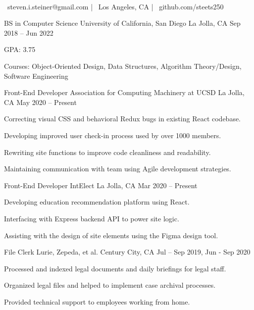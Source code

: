 \documentclass[]{awesome-cv}
\begin{document}
    
\begin{center}
	 \\
	\vspace{2mm}
	{\faEnvelope\ steven.i.steiner@gmail.com} | {\faMapMarker\ Los Angeles, CA} | {\faGithub\ github.com/steets250}
\end{center}

\begin{cventries}
	\cventry
	{BS in Computer Science}
	{University of California, San Diego}
	{La Jolla, CA}
	{Sep 2018 – Jun 2022}
	{\begin{cvitems}
		\item {GPA: 3.75}
		\item {Courses: Object-Oriented Design, Data Structures, Algorithm Theory/Design, Software Engineering}
		\end{cvitems}}
\end{cventries}

\vspace{-5mm}

\begin{cventries}
\cventry
	{Front-End Developer}
	{Association for Computing Machinery at UCSD}
	{La Jolla, CA}
	{May 2020 – Present}
	{\begin{cvitems}
		\item {Correcting visual CSS and behavioral Redux bugs in existing React codebase.}
		\item {Developing improved user check-in process used by over 1000 members.}
		\item {Rewriting site functions to improve code cleanliness and readability.}
		\item {Maintaining communication with team using Agile development strategies. }
		\end{cvitems}}
	\cventry
	{Front-End Developer}
	{IntElect}
	{La Jolla, CA}
	{Mar 2020 – Present}
	{\begin{cvitems}
		\item {Developing education recommendation platform using React.}
		\item {Interfacing with Express backend API to power site logic.}
		\item {Assisting with the design of site elements using the Figma design tool.}
		\end{cvitems}}
	\cventry
	{File Clerk}
	{Lurie, Zepeda, et al.}
	{Century City, CA}
	{Jul – Sep 2019, Jun - Sep 2020}
	{\begin{cvitems}
		\item {Processed and indexed legal documents and daily briefings for legal staff.}
		\item {Organized legal files and helped to implement case archival processes.}
		\item {Provided technical support to employees working from home.}
		\end{cvitems}}
\end{cventries}
\end{document}
